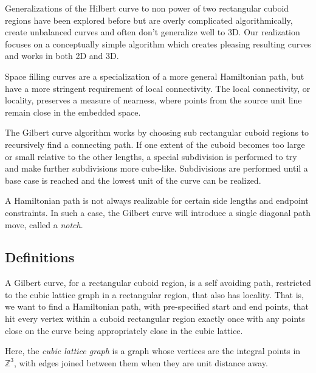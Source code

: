 Generalizations of the Hilbert curve to non power of two rectangular cuboid regions
have been explored before but are overly complicated algorithmically, create unbalanced
curves and often don't generalize well to 3D.
Our realization focuses on a conceptually simple algorithm which creates pleasing
resulting curves and works in both 2D and 3D.

Space filling curves are a specialization of a more general Hamiltonian path,
but have a more stringent requirement of local connectivity.
The local connectivity, or locality, preserves a measure of nearness, where
points from the source unit line remain close in the embedded space.

%



The Gilbert curve algorithm works by choosing sub rectangular cuboid regions
to recursively find a connecting path.
If one extent of the cuboid becomes too large or small relative to the other lengths,
a special subdivision is performed to try and make further subdivisions more cube-like.
Subdivisions are performed until a base case is reached and the lowest unit of the curve
can be realized.

A Hamiltonian path is not always realizable for certain side lengths and endpoint constraints.
In such a case, the Gilbert curve will introduce a single diagonal path move, called a \textit{notch}.


\subsection{Definitions}

A Gilbert curve, for a rectangular cuboid region, is
a self avoiding path,
restricted to the cubic lattice graph in a rectangular region, that also has locality.
That is, we want to find a Hamiltonian path, with pre-specified start and end points, that hit
every vertex within a cuboid rectangular region exactly once with any points close on the curve
being appropriately close in the cubic lattice.

Here, the \textit{cubic lattice graph} is a graph
whose vertices are the integral points in $\mathbb{Z}^3$, with edges joined between them when they
are unit distance away.

